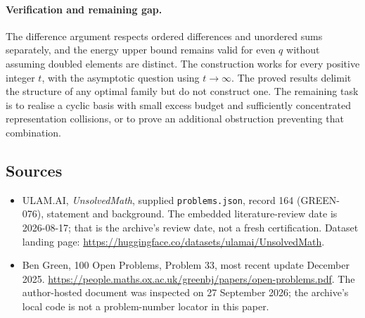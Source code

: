 \documentclass[11pt,a4paper]{article}
\begin{document}
\paragraph{Verification and remaining gap.}
The difference argument respects ordered differences and unordered sums separately, and the energy upper bound remains valid for even $q$ without assuming doubled elements are distinct. The construction works for every positive integer $t$, with the asymptotic question using $t\to\infty$. The proved results delimit the structure of any optimal family but do not construct one. The remaining task is to realise a cyclic basis with small excess budget and sufficiently concentrated representation collisions, or to prove an additional obstruction preventing that combination.

\subsection{Sources}

{\small

\begin{itemize}

\item[\hypertarget{source:164:1}{S1}] ULAM.AI, \emph{UnsolvedMath}, supplied \texttt{problems.json}, record 164 (GREEN-076), statement and background. The embedded literature-review date is 2026-08-17; that is the archive’s review date, not a fresh certification. Dataset landing page: \url{https://huggingface.co/datasets/ulamai/UnsolvedMath}.

\item[\hypertarget{source:164:2}{S2}] Ben Green, 100 Open Problems, Problem 33, most recent update December 2025. \url{https://people.maths.ox.ac.uk/greenbj/papers/open-problems.pdf}. The author-hosted document was inspected on 27 September 2026; the archive’s local code is not a problem-number locator in this paper.

\end{itemize}

}

\label{end:164}
\end{document}
